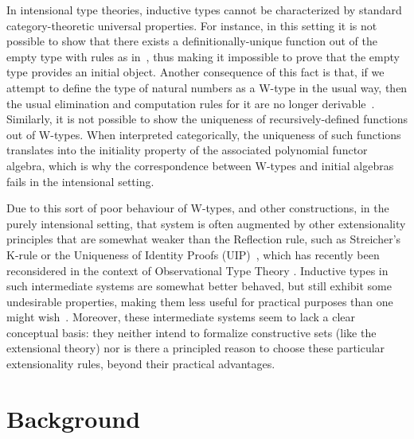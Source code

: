 \documentclass[10pt,a4paper,oneside,reqno]{amsart}
\theoremstyle{mythm}
\theoremstyle{mydef}
\theoremstyle{myrmk}
\begin{document}
In intensional type theories, inductive types cannot be characterized by standard category-theoretic
universal properties. For instance, in this setting it is not possible to show that there exists a 
definitionally-unique function out of the empty type with rules as in~\cite[Section~5.2]{NordstromB:marltt}, thus making it impossible to prove that the empty type provides an initial object. 
Another consequence of this fact is that, if we attempt to define the type of 
natural numbers as a W-type in the usual way, then 
the usual elimination and computation rules for it are no longer derivable~\cite{DybjerP:repids}. Similarly, it is not possible to show the uniqueness of recursively-defined functions out of W-types. When interpreted categorically, the uniqueness of such functions translates into the initiality property of the associated polynomial functor algebra, which is why the correspondence between W-types and initial algebras fails in the intensional setting.

Due to this sort of poor behaviour of W-types, and other constructions, in the purely intensional setting, that system is often augmented by other extensionality principles that are somewhat weaker than the Reflection rule, such as Streicher's K-rule  or the Uniqueness of Identity Proofs (UIP)~\cite{StreicherT:invitt}, which has recently been reconsidered
in the context of Observational Type Theory \cite{AltenkirchT:obsen}.  Inductive types in such intermediate systems are somewhat better behaved, but still exhibit some undesirable properties, making them less useful for practical purposes than one might wish~\cite{McBrideC:wtygnb}.  Moreover, these intermediate systems seem to lack a clear conceptual basis:  they neither intend to formalize constructive sets (like the extensional theory) nor is there a principled reason to choose these particular extensionality rules, beyond their practical advantages.  


\newpage

\section{Background}
\label{sec:bac}
\end{document}
